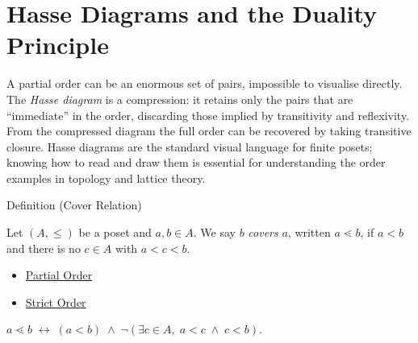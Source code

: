 
\section{Hasse Diagrams and the Duality Principle}\label{sec:hasse-duality}


\begin{exposition}
A partial order can be an enormous set of pairs, impossible to visualise
directly.  The \emph{Hasse diagram} is a compression: it retains only the
pairs that are ``immediate'' in the order, discarding those implied by
transitivity and reflexivity.  From the compressed diagram the full order
can be recovered by taking transitive closure.  Hasse diagrams are the
standard visual language for finite posets; knowing how to read and draw them
is essential for understanding the order examples in topology and lattice theory.
\end{exposition}


\begin{definitionbox}{Definition (Cover Relation)}
\begin{definition}\label{def:cover-relation}
Let $(A, \leq)$ be a poset and $a, b \in A$.  We say $b$ \emph{covers} $a$,
written $a \lessdot b$, if $a < b$ and there is no $c \in A$ with
$a < c < b$.
\end{definition}
\end{definitionbox}

\begin{dependencies}
\begin{itemize}
  \item \hyperref[def:partial-order]{Partial Order}
  \item \hyperref[def:strict-order]{Strict Order}
\end{itemize}
\end{dependencies}

\begin{remark*}
$a \lessdot b \;\leftrightarrow\; (a < b) \;\wedge\;
\neg(\exists c \in A,\; a < c \;\wedge\; c < b)$.
\end{remark*}

